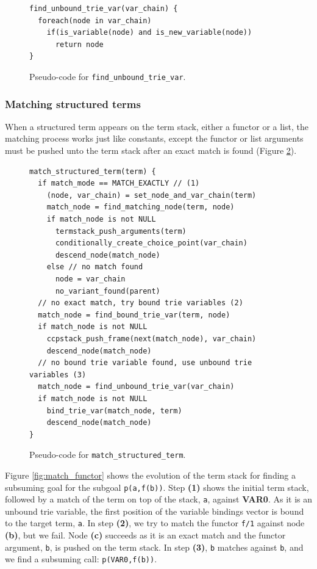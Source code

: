 \begin{figure}[ht]
\begin{Verbatim}[fontsize=\small]
find_unbound_trie_var(var_chain) {
  foreach(node in var_chain)
    if(is_variable(node) and is_new_variable(node))
      return node
}
\end{Verbatim}
\caption{Pseudo-code for \texttt{find\_unbound\_trie\_var}.}
\label{fig:find_unbound_trie_var}
\end{figure}

\subsubsection{Matching structured terms}

When a structured term appears on the term stack, either a functor or a list, the matching process works
just like constants, except the functor or list arguments must be pushed unto the term stack after an exact
match is found (Figure \ref{fig:match_structured_term}).

\begin{figure}[ht]
\begin{Verbatim}[fontsize=\small]
match_structured_term(term) {
  if match_mode == MATCH_EXACTLY // (1)
    (node, var_chain) = set_node_and_var_chain(term)
    match_node = find_matching_node(term, node)
    if match_node is not NULL
      termstack_push_arguments(term)
      conditionally_create_choice_point(var_chain)
      descend_node(match_node)
    else // no match found
      node = var_chain
      no_variant_found(parent)
  // no exact match, try bound trie variables (2)
  match_node = find_bound_trie_var(term, node)
  if match_node is not NULL
    ccpstack_push_frame(next(match_node), var_chain)
    descend_node(match_node)
  // no bound trie variable found, use unbound trie variables (3)
  match_node = find_unbound_trie_var(var_chain)
  if match_node is not NULL
    bind_trie_var(match_node, term)
    descend_node(match_node)
}
\end{Verbatim}
\caption{Pseudo-code for \texttt{match\_structured\_term}.}
\label{fig:match_structured_term}
\end{figure}

Figure \ref{fig:match_functor} shows the evolution of the term stack for finding
a subsuming goal for the subgoal \texttt{p(a,f(b))}. Step \textbf{(1)} shows the initial 
term stack, followed by a match of the term on top of the stack, \texttt{a}, against \textbf{VAR0}.
As it is an unbound trie variable, the first position of the variable bindings vector is
bound to the target term, \texttt{a}.
In step \textbf{(2)}, we try to match the functor \texttt{f/1} against node \textbf{(b)}, but we fail.
Node \textbf{(c)} succeeds as it is an exact match and the functor argument, \texttt{b}, is pushed on
the term stack. In step \textbf{(3)}, \texttt{b} matches against \texttt{b}, and we find a subsuming call:
\texttt{p(VAR0,f(b))}.

